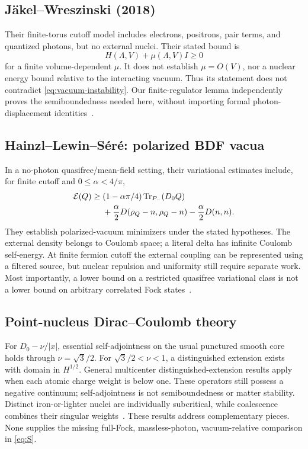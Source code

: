 \subsection{J\"akel--Wreszinski (2018)}
Their finite-torus cutoff model includes electrons, positrons, pair terms,
and quantized photons, but no external nuclei. Their stated bound is
\begin{equation}
H(\Lambda,V)+\mu(\Lambda,V)I\ge0
\end{equation}
for a finite volume-dependent \(\mu\). It does not establish \(\mu=O(V)\),
nor a nuclear energy bound relative to the interacting vacuum. Thus its
statement does not contradict \eqref{eq:vacuum-instability}. Our
finite-regulator lemma independently proves the semiboundedness needed here,
without importing formal photon-displacement identities~\cite{JW2018}.

\subsection{Hainzl--Lewin--S\'er\'e: polarized BDF vacua}
In a no-photon quasifree/mean-field setting, their variational estimates
include, for finite cutoff and \(0\le\alpha<4/\pi\),
\begin{equation}
\begin{split}
\mathcal E(Q)\ge{}&
(1-\alpha\pi/4)\operatorname{Tr}_{P_-}(D_0Q)\\
&+\frac{\alpha}{2}D(\rho_Q-n,\rho_Q-n)
-\frac{\alpha}{2}D(n,n).
\end{split}
\label{eq:BDF}
\end{equation}
They establish polarized-vacuum minimizers under the stated hypotheses.
The external density belongs to Coulomb space; a literal delta has infinite
Coulomb self-energy. At finite fermion cutoff the external coupling can be
represented using a filtered source, but nuclear repulsion and uniformity
still require separate work. Most importantly, a lower bound on a restricted
quasifree variational class is not a lower bound on arbitrary correlated
Fock states~\cite{HLS2004,HLS2005}.

\subsection{Point-nucleus Dirac--Coulomb theory}
For \(D_0-\nu/|x|\), essential self-adjointness on the usual punctured smooth
core holds through \(\nu=\sqrt3/2\). For \(\sqrt3/2<\nu<1\), a distinguished
extension exists with domain in \(H^{1/2}\). General multicenter
distinguished-extension results apply when each atomic charge weight is
below one. These operators still possess a negative continuum;
self-adjointness is not semiboundedness or matter stability. Distinct
iron-or-lighter nuclei are individually subcritical, while coalescence
combines their singular weights~\cite{ELS2021}.
These results address complementary pieces. None supplies the missing
full-Fock, massless-photon, vacuum-relative comparison in \eqref{eq:S}.

